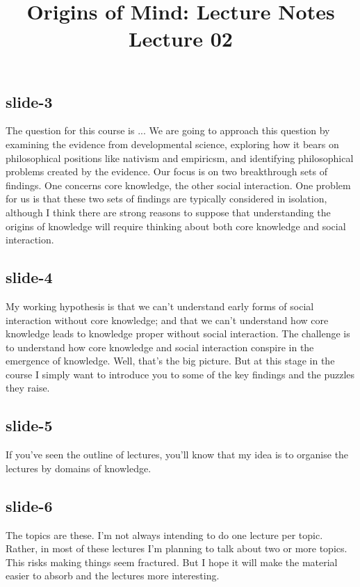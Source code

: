 \documentclass[12pt,\papersize]{extarticle}
\begin{document}
\setlength\footnotesep{1em}








\title {Origins of Mind: Lecture Notes \\ Lecture 02}
 
\maketitle
 
 
\subsection{slide-3}
The question for this course is ...
We are going to approach this question by examining the evidence from developmental science, exploring how it bears on philosophical positions like nativism and empiricsm, and identifying philosophical problems created by the evidence.
Our focus is on two breakthrough sets of findings.
One concerns core knowledge, the other social interaction.
One problem for us is that these two sets of findings are typically considered in isolation, although I think there are strong reasons to suppose that understanding the origins of knowledge will require thinking about both core knowledge and social interaction.
 
 
\subsection{slide-4}
My working hypothesis is that we can't understand early forms of social interaction without core knowledge; and that we can't understand how core knowledge leads to knowledge proper without social interaction.
The challenge is to understand how core knowledge and social interaction conspire in the emergence of knowledge.
Well, that's the big picture.
But at this stage in the course I simply want to introduce you to some of the key findings and the puzzles they raise.
 
 
\subsection{slide-5}
If you've seen the outline of lectures, you'll know that my idea is to organise the lectures by domains of knowledge.
 
 
\subsection{slide-6}
The topics are these.
I'm not always intending to do one lecture per topic.
Rather, in most of these lectures I'm planning to talk about two or more topics.
This risks making things seem fractured.
But I hope it will make the material easier to absorb and the lectures more interesting.
 
\end{document}
